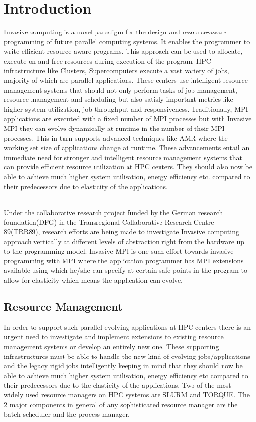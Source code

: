 \documentclass[a4paper, 12pt]{article}
\begin{document}
\newpage
\thispagestyle{empty}
\tableofcontents
\newpage

\setcounter{page}{1}
\section{Introduction}
Invasive computing is a novel paradigm for the design and resource-aware programming of future parallel computing systems. It enables the programmer to write efficient resource aware programs. This approach can be used to allocate, execute on and free resources during execution of the program. HPC infrastructure like Clusters, Supercomputers execute a vast variety of jobs, majority of which are parallel applications. These centers use intelligent resource management systems that should not only perform tasks of job management, resource management and scheduling but also satisfy important metrics like higher system utilization, job throughput and responsiveness. Traditionally, MPI applications are executed with a fixed number of MPI processes but with Invasive MPI they can evolve dynamically at runtime in the number of their MPI processes. This in turn supports advanced techniques like AMR where the working set size of applications change at runtime. These advancements entail an immediate need for stronger and intelligent resource management systems that can provide efficient resource utilization at HPC centers. They should also now be able to achieve much higher system utilisation, energy efficiency etc. compared to their predecessors due to elasticity of the applications.\par
\noindent
\\Under the collaborative research project funded by the German research foundation(DFG) in the Transregional Collaborative Research Centre 89(TRR89), research efforts are being made to investigate Invasive computing approach vertically at different levels of abstraction right from the hardware up to the programming model. Invasive MPI is one such effort towards invasive programming with MPI where the application programmer has MPI extensions available using which he/she can specify at certain safe points in the program to allow for elasticity which means the application can evolve.

\subsection{Resource Management}
In order to support such parallel evolving applications at HPC centers there is an urgent need to investigate and implement extensions to existing resource management systems or develop an entirely new one. These supporting infrastructures must be able to handle the new kind of evolving jobs/applications and the legacy rigid jobs intelligently keeping in mind that they should now be able to achieve much higher system utilisation, energy efficiency etc compared to their predecessors due to the elasticity of the applications. Two of the most widely used resource managers on HPC systems are SLURM and TORQUE. The 2 major components in general of any sophisticated resource manager are the batch scheduler and the process manager.
\end{document}
